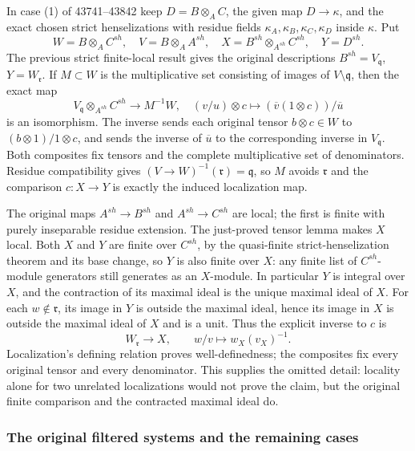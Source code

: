 In case (1) of 43741--43842 keep \(D=B\otimes_A C\), the given map \(D\to\kappa\), and the exact chosen strict henselizations with residue fields \(\kappa_A,\kappa_B,\kappa_C,\kappa_D\) inside \(\kappa\). Put \[
 W=B\otimes_A C^{sh},\quad V=B\otimes_A A^{sh},\quad
 X=B^{sh}\otimes_{A^{sh}}C^{sh},\quad Y=D^{sh}.
\] The previous strict finite-local result gives the original descriptions \(B^{sh}=V_{\mathfrak q}\), \(Y=W_{\mathfrak r}\). If \(M\subset W\) is the multiplicative set consisting of images of \(V\setminus\mathfrak q\), then the exact map \[
 V_{\mathfrak q}\otimes_{A^{sh}}C^{sh}\longrightarrow M^{-1}W,
 \quad (v/u)\otimes c\longmapsto (\overline v(1\otimes c))/\overline u
\] is an isomorphism. The inverse sends each original tensor \(b\otimes c\in W\) to \((b\otimes1)/1\otimes c\), and sends the inverse of \(\overline u\) to the corresponding inverse in \(V_{\mathfrak q}\). Both composites fix tensors and the complete multiplicative set of denominators. Residue compatibility gives \((V\to W)^{-1}(\mathfrak r)=\mathfrak q\), so \(M\) avoids \(\mathfrak r\) and the comparison \(c:X\to Y\) is exactly the induced localization map.

The original maps \(A^{sh}\to B^{sh}\) and \(A^{sh}\to C^{sh}\) are local; the first is finite with purely inseparable residue extension. The just-proved tensor lemma makes \(X\) local. Both \(X\) and \(Y\) are finite over \(C^{sh}\), by the quasi-finite strict-henselization theorem and its base change, so \(Y\) is also finite over \(X\): any finite list of \(C^{sh}\)-module generators still generates as an \(X\)-module. In particular \(Y\) is integral over \(X\), and the contraction of its maximal ideal is the unique maximal ideal of \(X\). For each \(w\notin\mathfrak r\), its image in \(Y\) is outside the maximal ideal, hence its image in \(X\) is outside the maximal ideal of \(X\) and is a unit. Thus the explicit inverse to \(c\) is \[
 W_{\mathfrak r}\longrightarrow X,\qquad w/v\longmapsto w_X(v_X)^{-1}.
\] Localization's defining relation proves well-definedness; the composites fix every original tensor and every denominator. This supplies the omitted detail: locality alone for two unrelated localizations would not prove the claim, but the original finite comparison and the contracted maximal ideal do.

\subsubsection{The original filtered systems and the remaining cases}\label{the-original-filtered-systems-and-the-remaining-cases}

